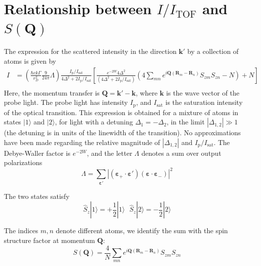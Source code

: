 \documentclass[11pt,letter]{article}
\newcommand{\bv}[1]{\ensuremath{\bm{#1}}}
\newcommand{\iisat}{\ensuremath{I_{\mathrm{p}}/I_{\mathrm{sat}}}}
\begin{document}
\section{ Relationship between $I/I_{\text{TOF}}$ and $S(\bv{Q})$}

The expression for the scattered intensity in the direction $\bv{k}'$ by a
collection of atoms is given by  
\begin{equation}
\begin{split} 
 I 
&  =
  \left( 
 \frac{\hbar c k \Gamma}{r_{D}^{2}}  
     \frac{9}{24\pi} \Lambda 
  \right) 
  \frac{ \iisat }{ 4 \Delta^{2} + 2 \iisat }
  \left[
      \frac{ e^{-2W}4 \Delta^{2}  } 
           {(4 \Delta^{2} + 2 \iisat) } 
   \left( 4\sum_{mn}  
      e^{ i \bv{Q}( \bv{R}_{m} - \bv{R}_{n} ) } 
      S_{zm}S_{zn}
     - N \right)
  + N 
   \right]  \\ 
\end{split}
\end{equation}
Here, the momentum transfer is $\bv{Q} = \bv{k}' - \bv{k}$, where $\bv{k}$ is
the wave vector of the probe light.  The probe light has intensity
$I_{\text{p}}$, and $I_{\text{sat}}$ is the saturation intensity of the optical
transition.  This expression is obtained for a mixture of atoms in states
$|1\rangle$ and $|2\rangle$, for light with a detuning $\Delta_{1} =
-\Delta_{2}$,  in the limit $|\Delta_{1,2}| \gg 1 $ (the detuning is in units
of the linewidth of the transition).   No approximations have been made
regarding the relative magnitude of $|\Delta_{1,2}|$ and \iisat.  The
Debye-Waller factor is $e^{-2W}$, and the letter $\Lambda$ denotes a sum over
output polarizations  
\begin{equation}
 \Lambda = 
  \sum_{\bv{\varepsilon}' }
        | (\bv{\varepsilon}_{+}\cdot \bv{\varepsilon}' )
                        (\bv{\varepsilon}\cdot \bv{\varepsilon}_{-} ) |^{2} 
\end{equation}

The two states satisfy
\begin{equation}
  \hat{S}_{z} |1\rangle = +\frac{1}{2} | 1\rangle \ \ \  
  \hat{S}_{z} |2\rangle = -\frac{1}{2}|2\rangle
\end{equation}

The indices $m,n$ denote different atoms,  we identify the sum with the spin
structure factor at momentum $\bv{Q}$: 
\begin{equation}
   S(\bv{Q}) =  
      \frac{4}{N}\sum_{mn}  
      e^{ i \bv{Q}( \bv{R}_{m} - \bv{R}_{n} ) } 
      S_{zm}S_{zn}
\end{equation}
\end{document}
